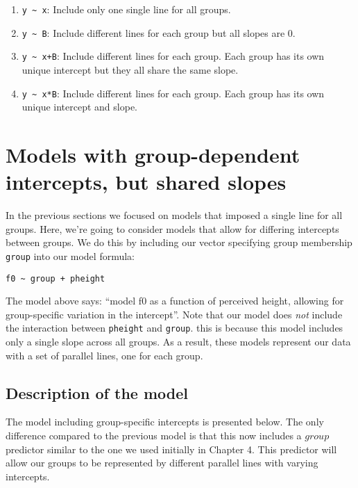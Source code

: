 \documentclass[
]{book}
\providecommand{\tightlist}{%
  \setlength{\itemsep}{0pt}\setlength{\parskip}{0pt}}
\begin{document}
\begin{enumerate}
\def\labelenumi{\arabic{enumi})}
\tightlist
\item
  \texttt{y\ \textasciitilde{}\ x}: Include only one single line for all groups.
\item
  \texttt{y\ \textasciitilde{}\ B}: Include different lines for each group but all slopes are 0.
\item
  \texttt{y\ \textasciitilde{}\ x+B}: Include different lines for each group. Each group has its own unique intercept but they all share the same slope.
\item
  \texttt{y\ \textasciitilde{}\ x*B}: Include different lines for each group. Each group has its own unique intercept and slope.
\end{enumerate}

\hypertarget{models-with-group-dependent-intercepts-but-shared-slopes}{%
\section{Models with group-dependent intercepts, but shared slopes}\label{models-with-group-dependent-intercepts-but-shared-slopes}}

In the previous sections we focused on models that imposed a single line for all groups. Here, we're going to consider models that allow for differing intercepts between groups. We do this by including our vector specifying group membership \texttt{group} into our model formula:

\texttt{f0\ \textasciitilde{}\ group\ +\ pheight}

The model above says: ``model f0 as a function of perceived height, allowing for group-specific variation in the intercept''. Note that our model does \emph{not} include the interaction between \texttt{pheight} and \texttt{group}. this is because this model includes only a single slope across all groups. As a result, these models represent our data with a set of parallel lines, one for each group.

\hypertarget{description-of-the-model-5}{%
\subsection{Description of the model}\label{description-of-the-model-5}}

The model including group-specific intercepts is presented below. The only difference compared to the previous model is that this now includes a \(group\) predictor similar to the one we used initially in Chapter 4. This predictor will allow our groups to be represented by different parallel lines with varying intercepts.
\end{document}
